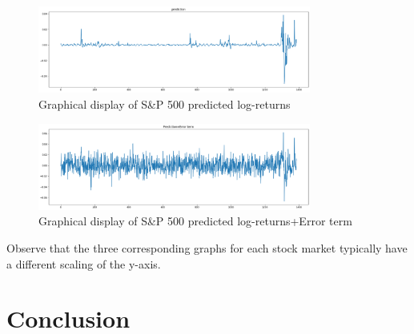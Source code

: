 \documentclass[a4paper,11pt,oneside]{book}
\begin{document}
\begin{figure}[!h]
	\centering
	\includegraphics[width=0.8\textwidth]{figures/sanppred}
	\caption{Graphical display of S\&P 500 predicted log-returns}
	\label{sanpred}
\end{figure}


\begin{figure}[!h]
	\centering
	\includegraphics[width=0.8\textwidth]{figures/sanperror}
	\caption{Graphical display of S\&P 500 predicted log-returns+Error term}
	\label{sanpERROR}
\end{figure}

Observe that the three corresponding graphs for each stock market typically have a different scaling of the y-axis.


\chapter{Conclusion}












	
\end{document}
